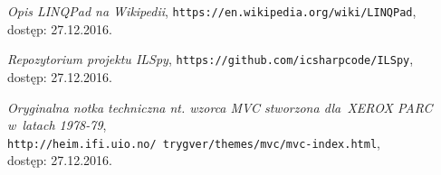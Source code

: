 \documentclass[a4paper,twoside,titlepage,openright]{book}
\begin{document}
\begin{thebibliography}{99}
 \textit{Opis LINQPad na Wikipedii}, 
\texttt{https://en.wikipedia.org/wiki/LINQPad}, \\dostęp: 27.12.2016.

 \textit{Repozytorium projektu ILSpy}, 
\texttt{https://github.com/icsharpcode/ILSpy}, \\dostęp: 27.12.2016.

 \textit{Oryginalna notka techniczna nt. wzorca MVC stworzona dla~XEROX PARC w~latach 1978-79}, \\
\texttt{http://heim.ifi.uio.no/~trygver/themes/mvc/mvc-index.html}, \\dostęp: 27.12.2016.



\end{thebibliography}
\end{document}
